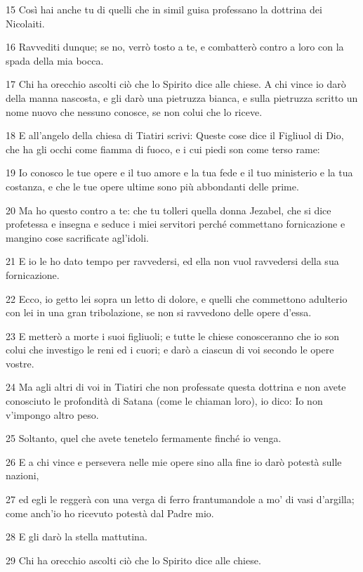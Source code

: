 \par 15 Così hai anche tu di quelli che in simil guisa professano la dottrina dei Nicolaiti.
\par 16 Ravvediti dunque; se no, verrò tosto a te, e combatterò contro a loro con la spada della mia bocca.
\par 17 Chi ha orecchio ascolti ciò che lo Spirito dice alle chiese. A chi vince io darò della manna nascosta, e gli darò una pietruzza bianca, e sulla pietruzza scritto un nome nuovo che nessuno conosce, se non colui che lo riceve.
\par 18 E all'angelo della chiesa di Tiatiri scrivi: Queste cose dice il Figliuol di Dio, che ha gli occhi come fiamma di fuoco, e i cui piedi son come terso rame:
\par 19 Io conosco le tue opere e il tuo amore e la tua fede e il tuo ministerio e la tua costanza, e che le tue opere ultime sono più abbondanti delle prime.
\par 20 Ma ho questo contro a te: che tu tolleri quella donna Jezabel, che si dice profetessa e insegna e seduce i miei servitori perché commettano fornicazione e mangino cose sacrificate agl'idoli.
\par 21 E io le ho dato tempo per ravvedersi, ed ella non vuol ravvedersi della sua fornicazione.
\par 22 Ecco, io getto lei sopra un letto di dolore, e quelli che commettono adulterio con lei in una gran tribolazione, se non si ravvedono delle opere d'essa.
\par 23 E metterò a morte i suoi figliuoli; e tutte le chiese conosceranno che io son colui che investigo le reni ed i cuori; e darò a ciascun di voi secondo le opere vostre.
\par 24 Ma agli altri di voi in Tiatiri che non professate questa dottrina e non avete conosciuto le profondità di Satana (come le chiaman loro), io dico: Io non v'impongo altro peso.
\par 25 Soltanto, quel che avete tenetelo fermamente finché io venga.
\par 26 E a chi vince e persevera nelle mie opere sino alla fine io darò potestà sulle nazioni,
\par 27 ed egli le reggerà con una verga di ferro frantumandole a mo' di vasi d'argilla; come anch'io ho ricevuto potestà dal Padre mio.
\par 28 E gli darò la stella mattutina.
\par 29 Chi ha orecchio ascolti ciò che lo Spirito dice alle chiese.

